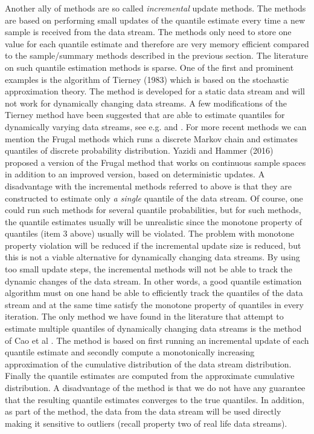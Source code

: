\documentclass[10pt, a4paper]{article}
\newtheorem{rational for conjecture}{Rational for Conjecture}
\begin{document}
Another ally of methods are so called  \emph{incremental} update methods. The methods are based on performing small updates of the quantile estimate every time a new sample is received from the data stream. The methods only need to store one value for each quantile estimate and therefore are very memory efficient compared to the sample/summary methods described in the previous section. The literature on such quantile estimation methods is sparse. One of the first and prominent examples is the algorithm of Tierney (1983) \cite{Tierney1983} which is based on the stochastic approximation theory. The method is developed for a static data stream and will not work for dynamically changing data streams. A few modifications of the Tierney method have been suggested that are able to estimate quantiles for dynamically varying data streams, see e.g. \cite{Chen2000} and \cite{cao2010tracking}. For more recent methods we can mention the Frugal methods  \cite{ma2013frugal} which runs a discrete Markov chain and estimates quantiles of discrete probability distribution. Yazidi and Hammer (2016) \cite{yazidi16} proposed a version of the Frugal method that works on continuous sample spaces in addition to an improved version, based on deterministic updates. A disadvantage with the incremental methods referred to above is that they are constructed to estimate only \textit{a single} quantile of the data stream. Of course, one could run such methods for several quantile probabilities, but for such methods, the quantile estimates usually will be unrealistic since the monotone property of quantiles (item 3 above) usually will be violated. The problem with monotone property violation will be reduced if the incremental update size is reduced, but this is not a viable alternative for dynamically changing data streams. By using too small update steps, the incremental methods will not be able to track the dynamic changes of the data stream. In other words, a good quantile estimation algorithm must on one hand be able to efficiently track the quantiles of the data stream and at the same time satisfy the monotone property of quantiles in every iteration. The only method we have found in the literature that attempt to estimate multiple quantiles of dynamically changing data streams is the method of Cao et al \cite{cao2009incremental}. The method is based on first running an incremental update of each quantile estimate and secondly compute a monotonically increasing approximation of the cumulative distribution of the data stream distribution. Finally the quantile estimates are computed from the approximate cumulative distribution. A disadvantage of the method is that we do not have any guarantee that the resulting quantile estimates converges to the true quantiles. In addition, as part of the method, the data from the data stream will be used directly making it sensitive to outliers (recall property two of real life data streams).
\end{document}
